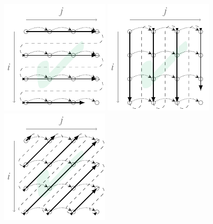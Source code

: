 \documentclass[presentation, aspectratio=169]{beamer}
\begin{document}
\begin{frame}[label={sec:orgea265b7}]{}
\begin{columns}
\begin{column}{0.45\columnwidth}
\begin{figure}
  \centering
  {\includegraphics[width=0.48\linewidth]{figs/schedule-i-j}}
  {\includegraphics[width=0.48\linewidth]{figs/schedule-j-i}}
  {\includegraphics[width=0.48\linewidth]{figs/schedule-ipj-j}}

\end{figure}
\end{column}
\end{columns}
\end{frame}
\end{document}

